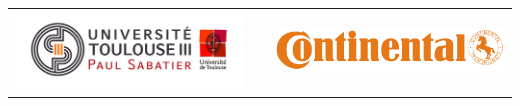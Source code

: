 \begin{titlepage}
\BgThispage
{}
\begin{tabular}{cp{2.8cm}c}
	\begin{minipage}{0.4\textwidth}
		\vspace{-40px}
		\hspace{-35px}
		\includegraphics[width=8cm]{styles/images/logos/ups.jpg}
	\end{minipage}
	&
	&
	\begin{minipage}{0.4\textwidth}
		\vspace{-40px}
		\includegraphics[width=8cm]{styles/images/logos/conti.png}
	\end{minipage}
	\\
\end{tabular}


\end{titlepage}
